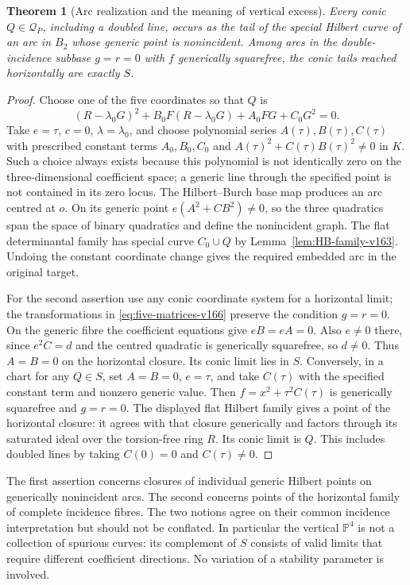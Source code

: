 \documentclass[11pt,reqno]{amsart}
\numberwithin{equation}{section}
\newtheorem{theorem}{Theorem}[section]
\theoremstyle{definition}\newtheorem{definition}[theorem]{Definition}
\theoremstyle{remark}\newtheorem{remark}[theorem]{Remark}
\newcommand{\Pj}{\mathbb P}\newcommand{\A}{\mathbb A}
\begin{document}
\begin{theorem}[Arc realization and the meaning of vertical excess]
\label{thm:conic-realization-v166}
Every conic $Q\in\mathcal Q_P$, including a doubled line, occurs as
the tail of the special Hilbert curve of an arc in $B_2$ whose
generic point is nonincident. Among arcs in the double-incidence
subbase $g=r=0$ with $f$ generically squarefree, the conic tails
reached horizontally are exactly $S$.
\end{theorem}
\begin{proof}
Choose one of the five coordinates so that $Q$ is
\[
 (R-\lambda_0G)^2+B_0F(R-\lambda_0G)+A_0FG+C_0G^2=0.
\]
Take $e=\tau$, $c=0$, $\lambda=\lambda_0$, and choose polynomial
series $A(\tau),B(\tau),C(\tau)$ with prescribed constant terms
$A_0,B_0,C_0$ and
$A(\tau)^2+C(\tau)B(\tau)^2\ne0$ in $K$. Such a choice always
exists because this polynomial is not identically zero on the
three-dimensional coefficient space; a generic line through the
specified point is not contained in its zero locus. The
Hilbert--Burch base map produces an arc centred at $o$. On its
generic point $e(A^2+CB^2)\ne0$, so the three quadratics span the
space of binary quadratics and define the nonincident graph. The
flat determinantal family has special curve $C_0\cup Q$ by
Lemma~\ref{lem:HB-family-v163}. Undoing the constant coordinate
change gives the required embedded arc in the original target.

For the second assertion use any conic coordinate system for a
horizontal limit; the transformations in
\eqref{eq:five-matrices-v166} preserve the condition $g=r=0$.
On the generic fibre the coefficient equations give $eB=eA=0$.
Also $e\ne0$ there, since $e^2C=d$ and the centred quadratic is
generically squarefree, so $d\ne0$. Thus $A=B=0$ on the horizontal
closure. Its conic limit lies in $S$. Conversely, in a chart for
any $Q\in S$, set $A=B=0$, $e=\tau$, and take $C(\tau)$ with the
specified constant term and nonzero generic value. Then
$f=x^2+\tau^2C(\tau)$ is generically squarefree and $g=r=0$.
The displayed flat Hilbert family gives a point of the horizontal
closure: it agrees with that closure generically and factors through
its saturated ideal over the torsion-free ring $R$. Its conic limit
is $Q$. This includes doubled lines by taking $C(0)=0$ and
$C(\tau)\ne0$.
\end{proof}

The first assertion concerns closures of individual generic Hilbert
points on generically nonincident arcs. The second concerns points
of the horizontal family of complete incidence fibres. The two
notions agree on their common incidence interpretation but should
not be conflated. In particular the vertical $\Pj^4$ is not a
collection of spurious curves: its complement of $S$ consists of
valid limits that require different coefficient directions. No
variation of a stability parameter is involved.
\end{document}
